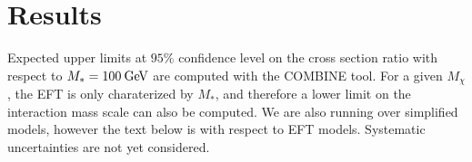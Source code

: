 \section{Results}
\label{sec:results}

Expected upper limits at $95\%$ confidence level on the cross section ratio with respect to $M_*=100\:\mathrm{Ge\kern -0.1em V}$ are computed with the COMBINE tool. For a given $M_\chi$, the EFT is only charaterized by $M_*$, and therefore a lower limit on the interaction mass scale can also be computed. We are also running over simplified models, however the text below is with respect to EFT models. Systematic uncertainties are not yet considered.


\clearpage

